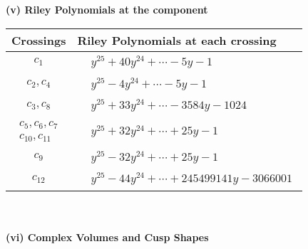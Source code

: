 \documentclass[1p]{elsarticle_modified}
\theoremstyle{definition}
\begin{document}
\newpage\renewcommand{\arraystretch}{1}
\flushleft \textbf{(v) Riley Polynomials at the component}\newline \\
\begin{tabular}{m{50pt}|m{274pt}}
Crossings & \hspace{64pt}Riley Polynomials at each crossing \\
\hline $$\begin{aligned}c_{1}\end{aligned}$$&$\begin{aligned}
&y^{25}+40 y^{24}+\cdots-5 y-1
\end{aligned}$\\
\hline $$\begin{aligned}c_{2},c_{4}\end{aligned}$$&$\begin{aligned}
&y^{25}-4 y^{24}+\cdots-5 y-1
\end{aligned}$\\
\hline $$\begin{aligned}c_{3},c_{8}\end{aligned}$$&$\begin{aligned}
&y^{25}+33 y^{24}+\cdots-3584 y-1024
\end{aligned}$\\
\hline $$\begin{aligned}c_{5},c_{6},c_{7}\\c_{10},c_{11}\end{aligned}$$&$\begin{aligned}
&y^{25}+32 y^{24}+\cdots+25 y-1
\end{aligned}$\\
\hline $$\begin{aligned}c_{9}\end{aligned}$$&$\begin{aligned}
&y^{25}-32 y^{24}+\cdots+25 y-1
\end{aligned}$\\
\hline $$\begin{aligned}c_{12}\end{aligned}$$&$\begin{aligned}
&y^{25}-44 y^{24}+\cdots+245499141 y-3066001
\end{aligned}$\\
\hline
\end{tabular}\\~\\
\newpage\flushleft \textbf{(vi) Complex Volumes and Cusp Shapes}
\end{document}
